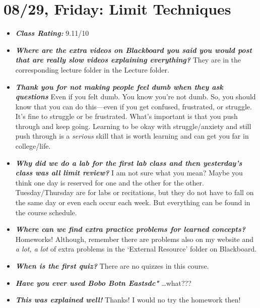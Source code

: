 \documentclass[11pt,letterpaper]{article}
\begin{document}
\newpage
\section*{08/29, Friday: Limit Techniques\label{08-29}}

\begin{itemize}
\item {\bfseries\itshape Class Rating:} 9.11/10

\item {\bfseries\itshape Where are the extra videos on Blackboard you said you would post that are really slow videos explaining everything?} They are in the corresponding lecture folder in the Lecture folder. 

\item {\bfseries\itshape Thank you for not making people feel dumb when they ask questions} Even if you felt dumb. You know you're not dumb. So, you should know that you can do this---even if you get confused, frustrated, or struggle. It's fine to struggle or be frustrated. What's important is that you push through and keep going. Learning to be okay with struggle/anxiety and still push through is a \textit{serious} skill that is worth learning and can get you far in college/life.

\item {\bfseries\itshape Why did we do a lab for the first lab class and then yesterday's class was all limit review?} I am not sure what you mean? Maybe you think one day is reserved for one and the other for the other. Tuesday/Thursday are for labs or recitations, but they do not have to fall on the same day or even each occur each week. But everything can be found in the course schedule. 

\item {\bfseries\itshape Where can we find extra practice problems for learned concepts?} Homeworks! \Winkey Although, remember there are problems also on my website and \textit{a lot, a lot} of extra problems in the `External Resource' folder on Blackboard.

\item {\bfseries\itshape When is the first quiz?} There are no quizzes in this course. 

\item {\bfseries\itshape Have you ever used Bobo Botn Eastsdc"} \dots what???

\item {\bfseries\itshape This was explained well!} Thanks! I would no try the homework then!


\end{itemize}
\end{document}
